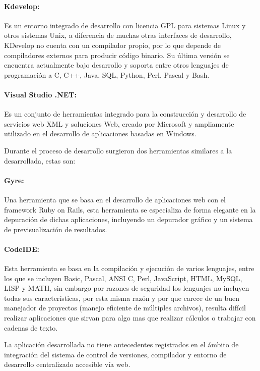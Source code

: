 \paragraph{Kdevelop: \cite{kdevelop}} Es un entorno integrado de desarrollo con licencia GPL para sistemas Linux y otros sistemas Unix, a diferencia de muchas otras interfaces de desarrollo, KDevelop no cuenta con un compilador propio, por lo que depende de compiladores externos para producir código binario. Su última versión se encuentra actualmente bajo desarrollo y soporta entre otros lenguajes de programación a C, C++, Java, SQL, Python, Perl, Pascal y Bash.

\paragraph{Visual Studio .NET: \cite{visual_studio}} Es un conjunto de herramientas integrado para la construcción y desarrollo de servicios web XML y soluciones Web, creado por Microsoft y ampliamente utilizado en el desarrollo de aplicaciones basadas en Windows.


Durante el proceso de desarrollo surgieron dos herramientas similares a la desarrollada, estas son:


\paragraph{Gyre:\cite{gyre}} Una herramienta que se basa en el desarrollo de aplicaciones web con el framework Ruby on Rails, esta herramienta se especializa de forma elegante en la depuración de dichas aplicaciones, incluyendo un depurador gráfico y un sistema de previsualización de resultados.

\paragraph{CodeIDE:\cite{codeide}} Esta herramienta se basa en la compilación y ejecución de varios lenguajes, entre los que se incluyen Basic, Pascal, ANSI C, Perl, JavaScript, HTML, MySQL, LISP y MATH, sin embargo por razones de seguridad los lenguajes no incluyen todas sus características, por esta misma razón y por que carece de un buen manejador de proyectos (manejo eficiente de múltiples archivos), resulta difícil realizar aplicaciones que sirvan para algo mas que realizar cálculos o trabajar con cadenas de texto.


La aplicación desarrollada no tiene antecedentes registrados en el ámbito de integración del sistema de control de versiones, compilador y entorno de desarrollo centralizado accesible vía web.


